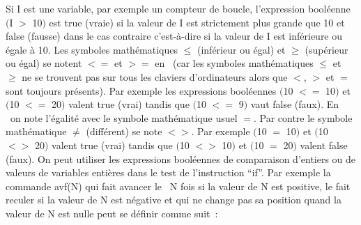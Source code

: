 Si {\idt I} est une variable, par exemple un compteur de boucle,
l'expression booléenne {\idt $($I $>$ 10$)$} est {\idt true} (vraie)
si la valeur de {\idt I} est strictement plus grande que 10 et {\idt
false} (fausse) dans le cas contraire c'est-à-dire si la valeur de {\idt
I} est inférieure ou égale à 10.  Les symboles mathématiques $\leq$
(inférieur ou égal) et $\geq$ (supérieur ou égal) se notent $<=$ et
$>=$ en \pascal\ (car les symboles mathématiques $\leq$ et $\geq$ ne
se trouvent pas sur tous les claviers d'ordinateurs alors que $<$, $>$
et $=$ sont toujours présents).  Par exemple les expressions
booléennes $($10 $<=$ 10$)$ et $($10 $<=$ 20$)$ valent {\idt true}
(vrai) tandis que $($10 $<=$ 9$)$ vaut {\idt false} (faux).  En
\pascal\ on note l'égalité avec le symbole mathématique usuel $=$. 
Par contre le symbole mathématique $\neq$ (différent) se note $<>$. 
Par exemple $($10 $=$ 10$)$ et $($10 $<>$ 20$)$ valent {\idt true}
(vrai) tandis que $($10 $<>$ 10$)$ et $($10 $=$ 20$)$ valent {\idt
false} (faux).  On peut utiliser les expressions booléennes de
comparaison d'entiers ou de valeurs de variables entières dans le test
de l'instruction ``if''.  Par exemple la commande {\idt avf(N)} qui
fait avancer le \robot\ {\idt N} fois si la valeur de {\idt N} est
positive, le fait reculer si la valeur de {\idt N} est négative et qui
ne change pas sa position quand la valeur de {\idt N} est nulle peut
se définir comme suit~:

